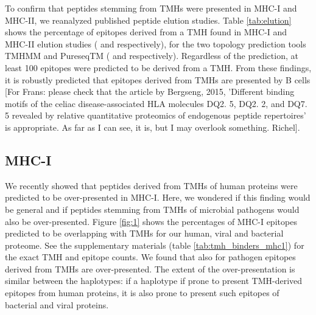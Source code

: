 To confirm that peptides stemming from TMHs were presented in MHC-I and MHC-II,
we reanalyzed published peptide elution studies.
Table \ref{tab:elution} shows the percentage of epitopes derived 
from a TMH
found in MHC-I and MHC-II elution 
studies (\cite{schellens2015comprehensive} and \cite{bergseng2015different} respectively),
for the two topology prediction tools TMHMM and 
PureseqTM (\cite{krogh2001predicting} and \cite{wang2019efficient} respectively). 
Regardless of the prediction, 
at least 100 epitopes were predicted to be derived from a TMH. 
From these findings, it is robustly predicted that
epitopes derived from TMHs are presented by B cells [For Frans: please check
that the article by Bergseng, 2015, 'Different binding motifs of the celiac 
disease-associated HLA molecules DQ2. 5, DQ2. 2, and DQ7. 5 revealed by 
relative quantitative proteomics of endogenous peptide repertoires'
is appropriate. As far as I can see, it is, but I may overlook something. Richel].


\subsection{MHC-I}

We recently showed that peptides derived from TMHs of human proteins 
were predicted to be over-presented in MHC-I. 
Here, we wondered if this finding would be general 
and if peptides stemming from TMHs of microbial pathogens 
would also be over-presented.
Figure \ref{fig:1} shows the percentages of MHC-I epitopes 
predicted to be overlapping 
with TMHs for our human, viral and bacterial proteome.
See the supplementary materials (table \ref{tab:tmh_binders_mhc1}) 
for the exact TMH and epitope counts.
We found that also for pathogen epitopes derived from TMHs are
over-presented. 
The extent of the over-presentation is similar between the haplotypes:
if a haplotype if prone to present TMH-derived epitopes from
human proteins, it is also prone to present such epitopes of
bacterial and viral proteins.


